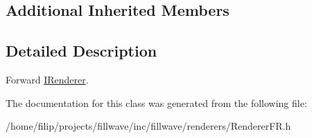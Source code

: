 \subsection*{Additional Inherited Members}


\subsection{Detailed Description}
Forward \hyperlink{classflw_1_1flf_1_1IRenderer}{I\+Renderer}. 

The documentation for this class was generated from the following file\+:\begin{DoxyCompactItemize}
\item 
/home/filip/projects/fillwave/inc/fillwave/renderers/Renderer\+F\+R.\+h\end{DoxyCompactItemize}
